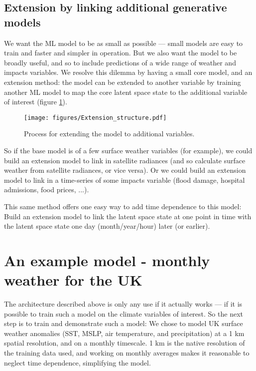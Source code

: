 \documentclass[gmd]{copernicus}
\begin{document}
\subsection{Extension by linking additional generative models}
\label{extension}

We want the ML model to be as small as possible --- small models are easy to train and faster and simpler in operation. But we also want the model to be broadly useful, and so to include predictions of a wide range of weather and impacts variables. We resolve this dilemma by having a small core model, and an extension method: the model can be extended to another variable by training another ML model to map the core latent space state to the additional variable of interest (figure \ref{Extension_structure}).

\begin{figure}[h]
\texttt{[image: figures/Extension\_structure.pdf]}
\caption{Process for extending the model to additional variables.}
\label{Extension_structure}
\end{figure}
     
So if the base model is of a few surface weather variables (for example), we could build an extension model to link in satellite radiances (and so calculate surface weather from satellite radiances, or vice versa). Or we could build an extension model to link in a time-series of some impacts variable (flood damage, hospital admissions, food prices, ...). 

This same method offers one easy way to add time dependence to this model: Build an extension model to link the latent space state at one point in time with the latent space state one day (month/year/hour) later (or earlier).


\section{An example model - monthly weather for the UK}

The architecture described above is only any use if it actually works --- if it is possible to train such a model on the climate variables of interest. So the next step is to train and demonstrate such a model: We chose to model UK surface weather anomalies (SST, MSLP, air temperature, and precipitation) at a 1 km spatial resolution, and on a monthly timescale. 1 km is the native resolution of the training data used, and working on monthly averages makes it reasonable to neglect time dependence, simplifying the model.
\end{document}
